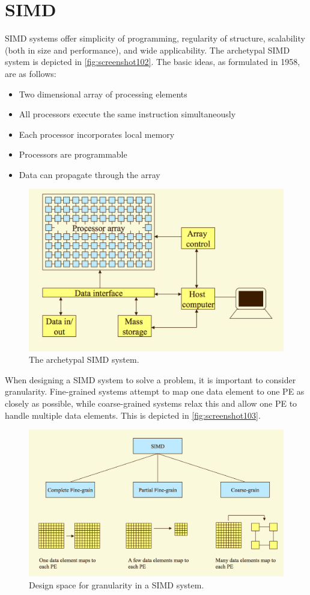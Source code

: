 \section{SIMD}
SIMD systems offer simplicity of programming, regularity of structure, scalability (both in size and performance), and wide applicability. The archetypal SIMD system is depicted in \autoref{fig:screenshot102}. The basic ideas, as formulated in 1958, are as follows: \begin{itemize}
\item Two dimensional array of processing elements 
\item All processors execute the same instruction simultaneously 
\item Each processor incorporates local memory 
\item Processors are programmable 
\item Data can propagate through the array 
\end{itemize}

\begin{figure}
\centering
\includegraphics[width=0.7\linewidth]{screenshot102}
\caption{The archetypal SIMD system.}
\label{fig:screenshot102}
\end{figure}

When designing a SIMD system to solve a problem, it is important to consider granularity. Fine-grained systems attempt to map one data element to one PE as closely as possible, while coarse-grained systems relax this and allow one PE to handle multiple data elements. This is depicted in \autoref{fig:screenshot103}.

\begin{figure}
\centering
\includegraphics[width=0.7\linewidth]{screenshot103}
\caption{Design space for granularity in a SIMD system.}
\label{fig:screenshot103}
\end{figure}

